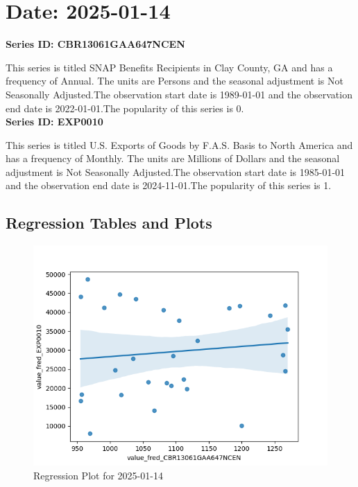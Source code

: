 \section{Date: 2025-01-14}
\noindent \textbf{Series ID: CBR13061GAA647NCEN} 

\noindent This series is titled SNAP Benefits Recipients in Clay County, GA and has a frequency of Annual. The units are Persons and the seasonal adjustment is Not Seasonally Adjusted.The observation start date is 1989-01-01 and the observation end date is 2022-01-01.The popularity of this series is 0. \\ 

\noindent \textbf{Series ID: EXP0010} 

\noindent This series is titled U.S. Exports of Goods by F.A.S. Basis to North America and has a frequency of Monthly. The units are Millions of Dollars and the seasonal adjustment is Not Seasonally Adjusted.The observation start date is 1985-01-01 and the observation end date is 2024-11-01.The popularity of this series is 1. \\ 

\subsection{Regression Tables and Plots}


\begin{figure}
\centering
\includegraphics[scale = 0.9]{plots/plot_2025-01-14.png}
\caption{Regression Plot for 2025-01-14}
\end{figure}
\newpage
